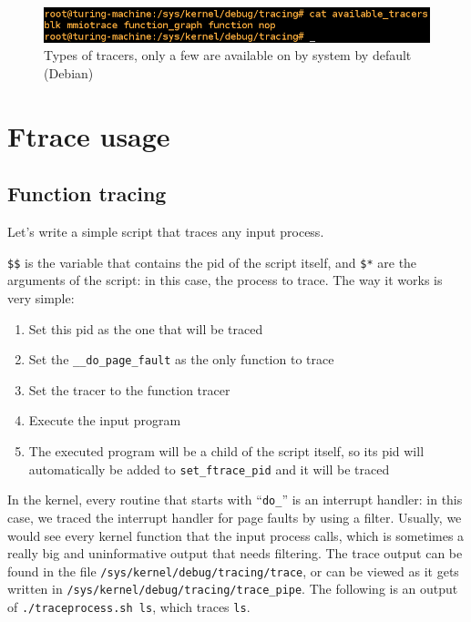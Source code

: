 \documentclass[10pt]{book}
\begin{document}
\begin{figure}[ht]
\includegraphics[width=\textwidth]{images/shell_tracers.png} 
\caption{Types of tracers, only a few are available on by system by default (Debian)}
\label{img:tracers}
\end{figure}

\section{Ftrace usage}

\subsection{Function tracing}
Let's write a simple script that traces any input process.
\verb|$$| is the variable that contains the pid of the script itself, and \verb|$*| are the arguments of the script: in this case, the process to trace. The way it works is very simple:
\begin{enumerate}
    \item Set this pid as the one that will be traced
    \item Set the \verb|__do_page_fault| as the only function to trace
    \item Set the tracer to the function tracer
    \item Execute the input program
    \item The executed program will be a child of the script itself, so its pid will automatically be added to \verb|set_ftrace_pid| and it will be traced
\end{enumerate}
In the kernel, every routine that starts with ``\verb|do_|'' is an interrupt handler: in this case, we traced the interrupt handler for page faults by using a filter. Usually, we would see every kernel function that the input process calls, which is sometimes a really big and uninformative output that needs filtering. The trace output can be found in the file \verb|/sys/kernel/debug/tracing/trace|, or can be viewed as it gets written in \verb|/sys/kernel/debug/tracing/trace_pipe|. The following is an output of \verb|./traceprocess.sh ls|, which traces \verb|ls|.
\end{document}
